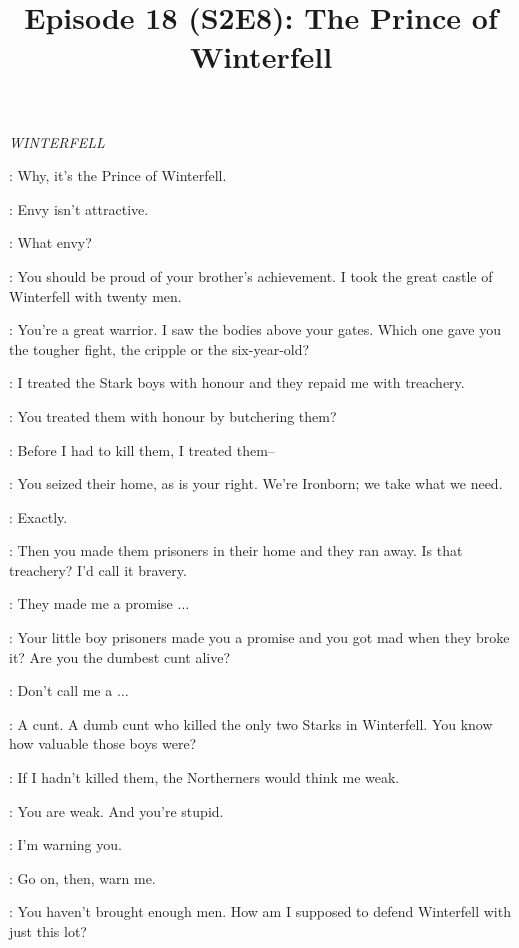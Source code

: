 

\title{Episode 18 (S2E8): The Prince of Winterfell}
\author{}
\date{}
\maketitle



\scene

\textit{WINTERFELL} 


\YARA: Why, it's the Prince of Winterfell. 

\THEON: Envy isn't attractive. 

\YARA: What envy? 

\THEON: You should be proud of your brother's achievement. I took the great castle of Winterfell with twenty men. 

\YARA: You're a great warrior. I saw the bodies above your gates. Which one gave you the tougher fight, the cripple or the six-year-old? 

\THEON: I treated the Stark boys with honour and they repaid me with treachery. 

\YARA: You treated them with honour by butchering them? 

\THEON: Before I had to kill them, I treated them--

\YARA: You seized their home, as is your right. We're Ironborn; we take what we need. 

\THEON: Exactly. 

\YARA: Then you made them prisoners in their home and they ran away. Is that treachery? I'd call it bravery. 

\THEON: They made me a promise $\ldots$  

\YARA: Your little boy prisoners made you a promise and you got mad when they broke it? Are you the dumbest cunt alive? 

\THEON: Don't call me a $\ldots$  

\YARA: A cunt. A dumb cunt who killed the only two Starks in Winterfell. You know how valuable those boys were? 

\THEON: If I hadn't killed them, the Northerners would think me weak. 

\YARA: You are weak. And you're stupid. 

\THEON: I'm warning you. 

\YARA: Go on, then, warn me. 

\THEON: You haven't brought enough men. How am I supposed to defend Winterfell with just this lot? 

